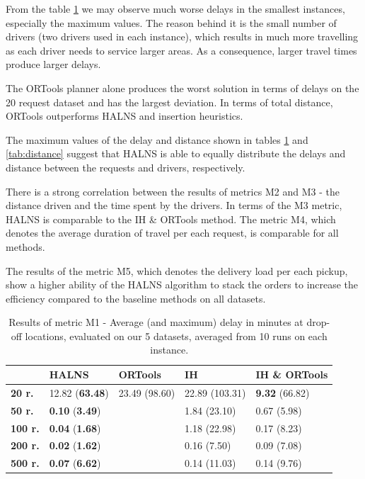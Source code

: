     From the table \ref{tab:delay} we may observe much worse delays in the smallest instances, especially the maximum values. The reason behind it is the small number of drivers (two drivers used in each instance), which results in much more travelling as each driver needs to service larger areas. As a consequence, larger travel times produce larger delays.
    
    The ORTools planner alone produces the worst solution in terms of delays on the 20 request dataset and has the largest deviation. In terms of total distance, ORTools outperforms HALNS and insertion heuristics.
    
    The maximum values of the delay and distance shown in tables \ref{tab:delay} and \ref{tab:distance} suggest that HALNS is able to equally distribute the delays and distance between the requests and drivers, respectively.
    
    There is a strong correlation between the results of metrics M2 and M3 - the distance driven and the time spent by the drivers. In terms of the M3 metric, HALNS is comparable to the IH \& ORTools method. The metric M4, which denotes the average duration of travel per each request, is comparable for all methods.
    
    The results of the metric M5, which denotes the delivery load per each pickup, show a higher ability of the HALNS algorithm to stack the orders to increase the efficiency compared to the baseline methods on all datasets.
    
    \begin{table}[!ht]
    \centering
    {\renewcommand{\arraystretch}{1.5}
    \begin{tabular}{lllll}
    \hline
                    & \textbf{HALNS}    & \textbf{ORTools}  & \textbf{IH}         & \textbf{IH \& ORTools} \\ \hline
    \textbf{20 r.}  & 12.82 (\textbf{63.48})     & 23.49 (98.60)     & 22.89 (103.31)      & \textbf{9.32} (66.82)           \\
    \textbf{50 r.}  & \textbf{0.10} (\textbf{3.49})       &                   & 1.84 (23.10)        & 0.67 (5.98)            \\
    \textbf{100 r.} & \textbf{0.04} (\textbf{1.68})       &                   & 1.18 (22.98)        & 0.17 (8.23)            \\
    \textbf{200 r.} & \textbf{0.02} (\textbf{1.62})       &                   & 0.16 (7.50)         & 0.09 (7.08)            \\
    \textbf{500 r.} & \textbf{0.07} (\textbf{6.62})       &                   & 0.14 (11.03)        & 0.14 (9.76)
    \end{tabular}}
    \caption{Results of metric M1 - Average (and maximum) delay in minutes at drop-off locations, evaluated on our 5 datasets, averaged from 10 runs on each instance.}
    \label{tab:delay}
    \end{table}
    
